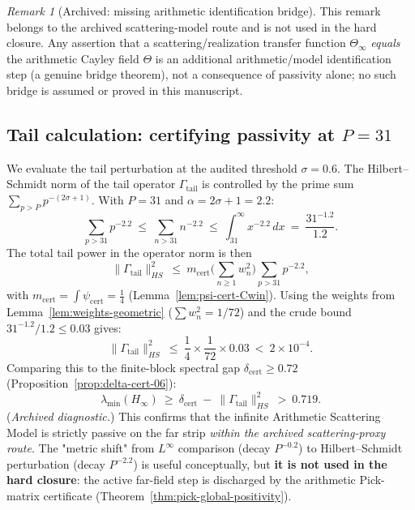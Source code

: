 \documentclass[11pt]{article}
\theoremstyle{definition}
\theoremstyle{remark}
\newtheorem{remark}[theorem]{Remark}
\theoremstyle{definition}
\begin{document}
\begin{remark}[Archived: missing arithmetic identification bridge]\label{rem:scattering-identity}
This remark belongs to the archived scattering-model route and is not used in the hard closure.
Any assertion that a scattering/realization transfer function \(\Theta_\infty\) \emph{equals} the arithmetic Cayley field \(\Theta\) is an additional arithmetic/model identification step (a genuine bridge theorem), not a consequence of passivity alone; no such bridge is assumed or proved in this manuscript.
\end{remark}

\subsection*{Tail calculation: certifying passivity at $P=31$}
We evaluate the tail perturbation at the audited threshold $\sigma = 0.6$. The Hilbert--Schmidt norm of the tail operator $\Gamma_{\mathrm{tail}}$ is controlled by the prime sum $\sum_{p > P} p^{-(2\sigma + 1)}$.
With $P = 31$ and $\alpha = 2\sigma + 1 = 2.2$:
\begin{equation}
  \sum_{p > 31} p^{-2.2}
  \ \le\ \sum_{n > 31} n^{-2.2}
  \ \le\ \int_{31}^\infty x^{-2.2}\,dx
  \ =\ \frac{31^{-1.2}}{1.2}.
\end{equation}
The total tail power in the operator norm is then
\[
  \|\Gamma_{\mathrm{tail}}\|_{HS}^2
  \ \le\ m_{\mathrm{cert}}\Big(\sum_{n\ge 1} w_n^2\Big)\sum_{p>31}p^{-2.2},
\]
with $m_{\mathrm{cert}}=\int\psi_{\mathrm{cert}}=\tfrac14$ (Lemma~\ref{lem:psi-cert-Cwin}).
Using the weights from Lemma~\ref{lem:weights-geometric} ($\sum w_n^2 = 1/72$) and the crude bound $31^{-1.2}/1.2\le 0.03$ gives:
\begin{equation}
  \|\Gamma_{\mathrm{tail}}\|_{HS}^2 \ \le \ \frac14 \times \frac{1}{72} \times 0.03 \ <\ 2\times 10^{-4}.
\end{equation}
Comparing this to the finite-block spectral gap $\delta_{\mathrm{cert}} \ge 0.72$ (Proposition~\ref{prop:delta-cert-06}):
\begin{equation}
  \lambda_{\min}(H_\infty) \ \ge \ \delta_{\mathrm{cert}} \ - \ \|\Gamma_{\mathrm{tail}}\|_{HS}^2 \ > \ 0.719.
\end{equation}
(\emph{Archived diagnostic.}) This confirms that the infinite Arithmetic Scattering Model is strictly passive on the far strip \emph{within the archived scattering-proxy route}. The "metric shift" from $L^\infty$ comparison (decay $P^{-0.2}$) to Hilbert--Schmidt perturbation (decay $P^{-2.2}$) is useful conceptually, but \textbf{it is not used in the hard closure}: the active far-field step is discharged by the arithmetic Pick-matrix certificate (Theorem~\ref{thm:pick-global-positivity}).
\end{document}
